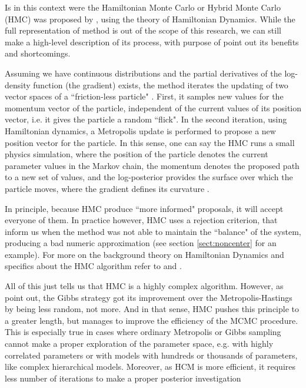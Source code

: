 Is in this context were the Hamiltonian Monte Carlo or Hybrid Monte Carlo (HMC) was proposed by \citet{Duane_et_al_1987}, using the theory of Hamiltonian Dynamics. While the full representation of method is out of the scope of this research, we can still make a high-level description of its process, with purpose of point out its benefits and shortcomings. 

Assuming we have continuous distributions and the partial derivatives of the log-density function (the gradient) exists, the method iterates the updating of two vector spaces of a ``friction-less particle" \cite{Neal_2011, McElreath_2020}. First, it samples new values for the momentum vector of the particle, independent of the current values of its position vector, i.e. it gives the particle a random ``flick". In the second iteration, using Hamiltonian dynamics, a Metropolis update is performed to propose a new position vector for the particle. In this sense, one can say the HMC runs a small physics simulation, where the position of the particle denotes the current parameter values in the Markov chain, the momentum denotes the proposed path to a new set of values, and the log-posterior provides the surface over which the particle moves, where the gradient defines its curvature \cite{McElreath_2020}.

In principle, because HMC produce ``more informed" proposals, it will accept everyone of them. In practice however, HMC uses a rejection criterion, that inform us when the method was not able to maintain the ``balance" of the system, producing a bad numeric approximation (see section \ref{sect:noncenter} for an example). For more on the background theory on Hamiltonian Dynamics and specifics about the HMC algorithm refer to \citet{Neal_2011} and \citet{Betancourt_et_al_2013}.

All of this just tells us that HMC is a highly complex algorithm. However, as \citet{McElreath_2020} point out, the Gibbs strategy got its improvement over the Metropolis-Hastings by being less random, not more. And in that sense, HMC pushes this principle to a greater length, but manages to improve the efficiency of the MCMC procedure. This is especially true in cases where ordinary Metropolis or Gibbs sampling cannot make a proper exploration of the parameter space, e.g. with highly correlated parameters or with models with hundreds or thousands of parameters, like complex hierarchical models. Moreover, as HCM is more efficient, it requires less number of iterations to make a proper posterior investigation \cite{McElreath_2020, Gelman_et_al_2014} 

